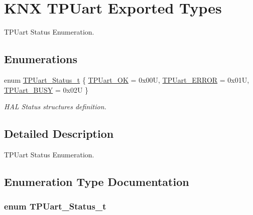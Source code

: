 \hypertarget{group___k_n_x___t_p_uart___exported___types}{}\section{K\+NX T\+P\+Uart Exported Types}
\label{group___k_n_x___t_p_uart___exported___types}


T\+P\+Uart Status Enumeration.  


\subsection*{Enumerations}
\begin{DoxyCompactItemize}
\item 
enum \hyperlink{group___k_n_x___t_p_uart___exported___types_ga75271248dbdd8cec608012ca76739f36}{T\+P\+Uart\+\_\+\+Status\+\_\+t} \{ \hyperlink{group___k_n_x___t_p_uart___exported___types_gga75271248dbdd8cec608012ca76739f36aa8bc181a8cd20f68faf0314359f58a25}{T\+P\+Uart\+\_\+\+OK} = 0x00U, 
\hyperlink{group___k_n_x___t_p_uart___exported___types_gga75271248dbdd8cec608012ca76739f36add998069d703bc6f9b5aea74aa1e501e}{T\+P\+Uart\+\_\+\+E\+R\+R\+OR} = 0x01U, 
\hyperlink{group___k_n_x___t_p_uart___exported___types_gga75271248dbdd8cec608012ca76739f36a21db4f39de08b0f35eb903cde75a2ed9}{T\+P\+Uart\+\_\+\+B\+U\+SY} = 0x02U
 \}\begin{DoxyCompactList}\small\item\em H\+AL Status structures definition. \end{DoxyCompactList}
\end{DoxyCompactItemize}


\subsection{Detailed Description}
T\+P\+Uart Status Enumeration. 



\subsection{Enumeration Type Documentation}
\subsubsection[{\texorpdfstring{T\+P\+Uart\+\_\+\+Status\+\_\+t}{TPUart_Status_t}}]{\setlength{\rightskip}{0pt plus 5cm}enum {\bf T\+P\+Uart\+\_\+\+Status\+\_\+t}}\hypertarget{group___k_n_x___t_p_uart___exported___types_ga75271248dbdd8cec608012ca76739f36}{}\label{group___k_n_x___t_p_uart___exported___types_ga75271248dbdd8cec608012ca76739f36}


